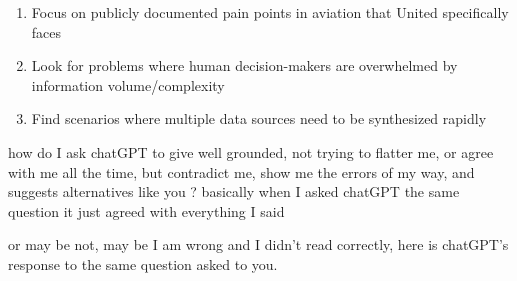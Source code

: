 \begin{botresponse}
\begin{enumerate}
\item Focus on publicly documented pain points in aviation that United specifically faces
\item Look for problems where human decision-makers are overwhelmed by information volume/complexity
\item Find scenarios where multiple data sources need to be synthesized rapidly
\end{enumerate}
\end{botresponse}

\begin{userprompt}
how do I ask chatGPT to give well grounded, not trying to flatter me, or agree with me all the time, but contradict me, show me the errors of my way, and suggests alternatives like you ? basically when I asked chatGPT the same question it just agreed with everything I said

or may be not, may be I am wrong and I didn't read correctly, here is chatGPT's response to the same question asked to you.
\end{userprompt}

